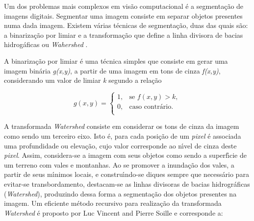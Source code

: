 Um dos problemas mais complexos em vis\~{a}o computacional \'{e} a segmenta\c{c}\~{a}o de imagens digitais. Segmentar uma imagem consiste em separar objetos presentes numa dada imagem. Existem v\'{a}rias t\'{e}cnicas de segmenta\c{c}\~{a}o, duas das quais s\~{a}o: a binariza\c{c}\~{a}o por limiar e a transforma\c{c}\~{a}o que define a linha divisora de bacias hidrog\'{a}ficas ou \textit{Wahershed} \cite{Digabel,Lantuejoul,Beucher,Luc}.

A binariza\c{c}\~{a}o por limiar \'{e} uma t\'{e}cnica simples que consiste em gerar uma imagem bin\'{a}ria \textit{g(x,y)}, a partir de uma imagem em tons de cinza \textit{f(x,y)}, considerando um valor de limiar \textit{k} segundo a rela\c{c}\~{a}o \cite{Gonzales}


\begin{equation}
\label{eqD9}
g(x,y) = \left\{ \begin{array}{ll}
1, & \textrm{se } f(x,y)>k,\\
0, & \textrm{caso contr\'{a}rio}.\\
\end{array} \right.
\end{equation}


A transformada \textit{Watershed} consiste em considerar os tons de cinza da imagem como sendo um terceiro eixo. Isto \'{e}, para cada posi\c{c}\~{a}o de um \textit{pixel} \'{e} associada uma profundidade ou eleva\c{c}\~{a}o, cujo valor corresponde ao n\'{\i}vel de cinza deste \textit{pixel}. Assim, considera-se a imagem com seus objetos como sendo a superf\'{\i}cie de um terreno com vales e montanhas. Ao se promover a inunda\c{c}\~{a}o dos vales, a partir de seus m\'{\i}nimos locais, e constru\'{\i}ndo-se diques sempre que necess\'{a}rio para evitar-se transbordamento, destacam-se as linhas divisoras de bacias hidrogr\'{a}ficas (\textit{Watershed}), produzindo dessa forma a segmenta\c{c}\~{a}o dos objetos presentes na imagem. Um eficiente m\'{e}todo recursivo para realiza\c{c}\~{a}o da transformada \textit{Watershed} \'{e} proposto por Luc Vincent and Pierre Soille \cite{Luc} e corresponde a:

